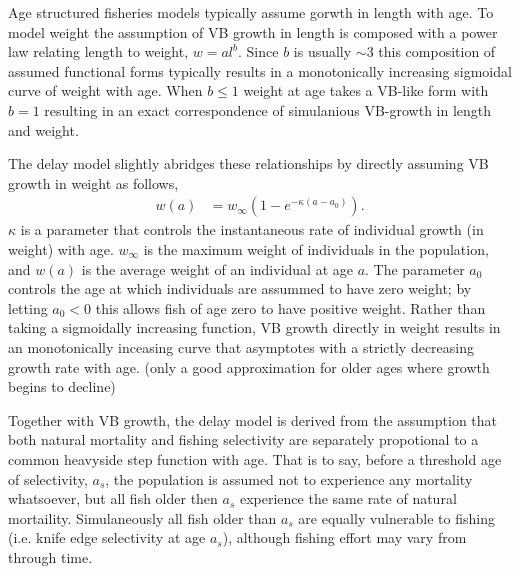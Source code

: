 %
Age structured fisheries models typically assume %
\cite[VB]{von_bertalanffy_quantitative_1938} gorwth in length with age. To model
weight the assumption of VB growth in length is composed with a power law 
relating length to weight, $w=al^b$. 
%
Since $b$ is usually $\sim3$ this composition of assumed functional forms
typically results in a monotonically increasing sigmoidal curve of weight with age.
When $b\le1$ weight at age takes a VB-like form with $b=1$ resulting in
an exact correspondence of simulanious VB-growth in length and weight.

%
The delay model slightly abridges these relationships by directly assuming VB
growth in weight as follows,
%
\begin{align}
w(a) &= w_\infty(1-e^{-\kappa (a-a_0)}). \label{vbGrowth}
\end{align}
%
$\kappa$ is a parameter that controls the instantaneous rate of individual
growth (in weight) with age. $w_\infty$ is the maximum weight of individuals
in the population, and $w(a)$ is the average weight of an individual at
age $a$. The parameter $a_0$ controls the age at which individuals are assummed
to have zero weight; by letting $a_0<0$ this allows fish of age zero to have
positive weight. Rather than taking a sigmoidally increasing function, VB growth
directly in weight results in an monotonically inceasing curve that asymptotes
with a strictly decreasing growth rate with age.
{\color{red}(only a good approximation for older ages where growth begins to decline)}

%
Together with VB growth, the delay model is derived from the assumption that
both natural mortality and fishing selectivity are separately propotional
to a common heavyside step function with age. That is to say, before a threshold
age of selectivity, $a_s$, the population is assumed not to experience any
mortality whatsoever, but all fish older then $a_s$ experience the same rate
of natural mortaility. Simulaneously all fish older than $a_s$ are equally
vulnerable to fishing (i.e. knife edge selectivity at age $a_s$), although
fishing effort may vary from through time.

